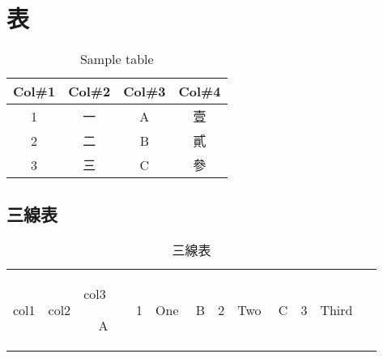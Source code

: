 \chapter{表}
\begin{table}[htbp]
    \centering                  %
    \begin{tabular}{c c c c}    %
        \hline\hline                
        Col\#1 & Col\#2 & Col\#3 & Col\#4 \\ [0.5ex]
        \hline                      
        1 & 一 & A & 壹 \\
        2 & 二 & B & 貳 \\
        3 & 三 & C & 參 \\ [1ex]    %
        \hline                      
    \end{tabular}
    \caption{Sample table}         %
    \label{tab:123table}           %
\end{table}

\section{三線表}
\begin{table}
  \centering
  \renewcommand{\arraystretch}{1.6}
  \begin{tabular}{lcc}
    \toprule
        col1 & col2 & col3 \ \
    \cmidrule(r){1-1}\cmidrule(lr){2-2}\cmidrule(l){3-3}          
        A & 1 & One   \ \
        B & 2 & Two   \ \
        C & 3 & Third \ \
    \bottomrule
  \end{tabular}
  \caption{三線表}
  \label{tab:三線表}
\end{table}

